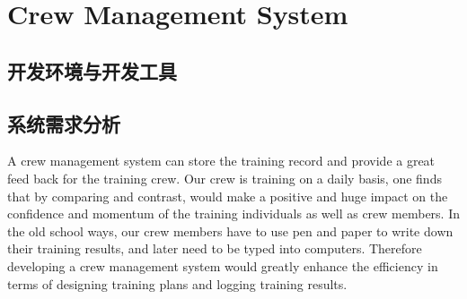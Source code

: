 \chapter{Crew Management System}

\section{开发环境与开发工具}

\section{系统需求分析}%


A crew management system can store the training record and provide a great feed
back for the training crew. Our crew is training on a daily basis, one finds
that by comparing and contrast, would make a positive and huge impact on the
confidence and momentum of the training individuals as well as crew members.
In the old school ways, our crew members have to use pen and paper to write down
their training results, and later need to be typed into computers. Therefore
developing a crew management system would greatly enhance the efficiency in
terms of designing training plans and logging training results.


